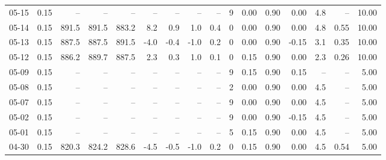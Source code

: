 \begin{threeparttable}
{\begin{tabular}{lrrrrrrrrrrrrrrr}
  05-15 &     0.15 &    -- &    -- &    -- &         -- &             -- &                       -- &                  -- &              9 &       0.00 &      0.90 &           0.00 &              4.8 &              -- &                  10.00 \\
  05-14 &     0.15 & 891.5 & 891.5 & 883.2 &        8.2 &            0.9 &                      1.0 &                 0.4 &              0 &       0.00 &      0.90 &           0.00 &              4.8 &            0.55 &                  10.00 \\
  05-13 &     0.15 & 887.5 & 887.5 & 891.5 &       -4.0 &           -0.4 &                     -1.0 &                 0.2 &              0 &       0.00 &      0.90 &          -0.15 &              3.1 &            0.35 &                  10.00 \\
  05-12 &     0.15 & 886.2 & 889.7 & 887.5 &        2.3 &            0.3 &                      1.0 &                 0.1 &              0 &       0.15 &      0.90 &           0.00 &              2.3 &            0.26 &                  10.00 \\
  05-09 &     0.15 &    -- &    -- &    -- &         -- &             -- &                       -- &                  -- &              9 &       0.15 &      0.90 &           0.15 &               -- &              -- &                   5.00 \\
  05-08 &     0.15 &    -- &    -- &    -- &         -- &             -- &                       -- &                  -- &              2 &       0.00 &      0.90 &           0.00 &              4.5 &              -- &                   5.00 \\
  05-07 &     0.15 &    -- &    -- &    -- &         -- &             -- &                       -- &                  -- &              9 &       0.00 &      0.90 &           0.00 &              4.5 &              -- &                   5.00 \\
  05-02 &     0.15 &    -- &    -- &    -- &         -- &             -- &                       -- &                  -- &              9 &       0.00 &      0.90 &          -0.15 &              4.5 &              -- &                   5.00 \\
  05-01 &     0.15 &    -- &    -- &    -- &         -- &             -- &                       -- &                  -- &              5 &       0.15 &      0.90 &           0.00 &              4.5 &              -- &                   5.00 \\
  04-30 &     0.15 & 820.3 & 824.2 & 828.6 &       -4.5 &           -0.5 &                     -1.0 &                 0.2 &              0 &       0.15 &      0.90 &           0.00 &              4.5 &            0.54 &                   5.00 \\

\end{tabular}}
\end{threeparttable}
